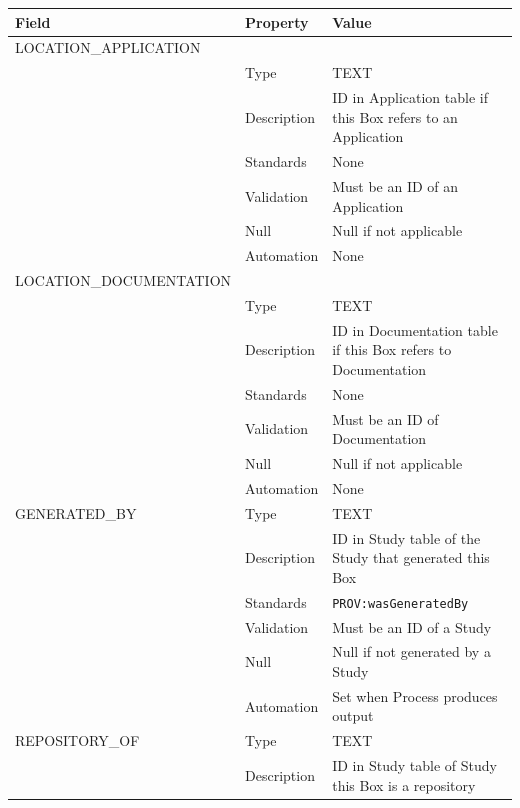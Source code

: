 \begin{longtable}[]{@{}
  >{\raggedright\arraybackslash}p{}
  >{\raggedright\arraybackslash}p{}
  >{\raggedright\arraybackslash}p{}@{}}
\toprule\noalign{}
\begin{minipage}[b]{\linewidth}\raggedright
Field
\end{minipage} & \begin{minipage}[b]{\linewidth}\raggedright
Property
\end{minipage} & \begin{minipage}[b]{\linewidth}\raggedright
Value
\end{minipage} \\
\midrule\noalign{}
\endhead
\bottomrule\noalign{}
\endlastfoot
LOCATION\_APPLICATION & & \\
& Type & TEXT \\
& Description & ID in Application table if this Box refers to an
Application \\
& Standards & None \\
& Validation & Must be an ID of an Application \\
& Null & Null if not applicable \\
& Automation & None \\
LOCATION\_DOCUMENTATION & & \\
& Type & TEXT \\
& Description & ID in Documentation table if this Box refers to
Documentation \\
& Standards & None \\
& Validation & Must be an ID of Documentation \\
& Null & Null if not applicable \\
& Automation & None \\
GENERATED\_BY & Type & TEXT \\
& Description & ID in Study table of the Study that generated this
Box \\
& Standards & \texttt{PROV:wasGeneratedBy} \\
& Validation & Must be an ID of a Study \\
& Null & Null if not generated by a Study \\
& Automation & Set when Process produces output \\
REPOSITORY\_OF & Type & TEXT \\
& Description & ID in Study table of Study this Box is a repository

\end{longtable}
